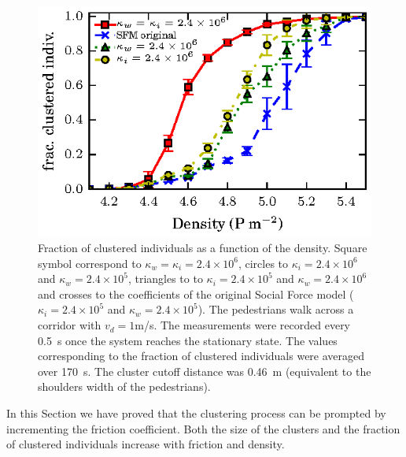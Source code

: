 \begin{figure}[htbp!]
\includegraphics[width=\columnwidth]
{plots/fracc_clusteriz_vs_density.eps}
\caption{\label{fic} Fraction of clustered individuals as a function of the density. Square symbol correspond to $\kappa_w=\kappa_i=2.4\times 10^6$, circles to $\kappa_i=2.4\times 10^6$ and $\kappa_w=2.4\times 10^5$, triangles to to $\kappa_i=2.4\times 10^5$ and $\kappa_w=2.4\times 10^6$ and crosses to the coefficients of the original Social Force model ($\kappa_i=2.4\times 10^5$ and $\kappa_w=2.4\times 10^5$). The pedestrians walk across a corridor with $v_d=1$m/s. The measurements were recorded every 0.5~s once the system reaches the stationary state. The values corresponding to the fraction of clustered individuals were averaged over 170~s. The cluster cutoff distance was 0.46~m (equivalent to the shoulders width of the pedestrians).}
\end{figure}

In this Section we have proved that the clustering process can be prompted by incrementing the friction coefficient. Both the size of the clusters and the fraction of clustered individuals increase with friction and density.\\

